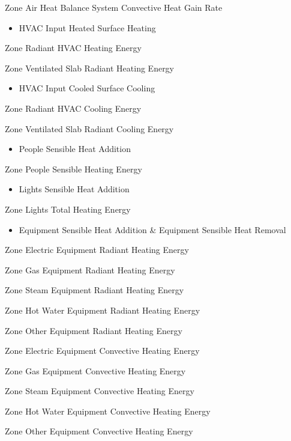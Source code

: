 Zone Air Heat Balance System Convective Heat Gain Rate

\begin{itemize}
\tightlist
\item
  HVAC Input Heated Surface Heating
\end{itemize}

Zone Radiant HVAC Heating Energy

Zone Ventilated Slab Radiant Heating Energy

\begin{itemize}
\tightlist
\item
  HVAC Input Cooled Surface Cooling
\end{itemize}

Zone Radiant HVAC Cooling Energy

Zone Ventilated Slab Radiant Cooling Energy

\begin{itemize}
\tightlist
\item
  People Sensible Heat Addition
\end{itemize}

Zone People Sensible Heating Energy

\begin{itemize}
\tightlist
\item
  Lights Sensible Heat Addition
\end{itemize}

Zone Lights Total Heating Energy

\begin{itemize}
\tightlist
\item
  Equipment Sensible Heat Addition \& Equipment Sensible Heat Removal
\end{itemize}

Zone Electric Equipment Radiant Heating Energy

Zone Gas Equipment Radiant Heating Energy

Zone Steam Equipment Radiant Heating Energy

Zone Hot Water Equipment Radiant Heating Energy

Zone Other Equipment Radiant Heating Energy

Zone Electric Equipment Convective Heating Energy

Zone Gas Equipment Convective Heating Energy

Zone Steam Equipment Convective Heating Energy

Zone Hot Water Equipment Convective Heating Energy

Zone Other Equipment Convective Heating Energy

